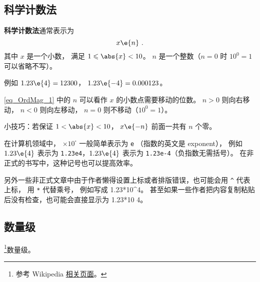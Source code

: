
\begin{issues}
\issueDraft
\end{issues}

\subsection{科学计数法}
\textbf{科学计数法}通常表示为
\begin{equation}\label{eq_OrdMag_1}
x \e{n}~.
\end{equation}
其中 $x$ 是一个小数， 满足 $1 \leqslant \abs{x} < 10$。 $n$ 是一个整数（$n=0$ 时 $10^{0} = 1$ 可以省略不写）。

例如 $1.23\e{4} = 12300$， $1.23\e{-4} = 0.000123$。

\autoref{eq_OrdMag_1} 中的 $n$ 可以看作 $x$ 的小数点需要移动的位数。 $n > 0$ 则向右移动， $n < 0$ 则向左移动， $n=0$ 则不移动（$10^{0} = 1$）。

小技巧：若保证 $1 < \abs{x} < 10$， $x\e{-n}$ 前面一共有 $n$ 个零。

在计算机领域中， $\times 10^\square$ 一般简单表示为 \verb`e` （指数的英文是 exponent）， 例如 $1.23\e{4}$ 表示为 \verb`1.23e4`，$1.23\e{4}$ 表示为 \verb`1.23e-4`（负指数无需括号）。 在非正式的书写中，这种记号也可以提高效率。

另外一些非正式文章中由于作者懒得设置上标或者排版错误，也可能会用 \verb`^` 代表上标， 用 \verb`*` 代替乘号， 例如写成 1.23*10^4。 甚至如果一些作者把内容复制粘贴后没有检查，也可能会直接显示为 1.23*10 4。

\subsection{数量级}
\footnote{参考 Wikipedia \href{https://en.wikipedia.org/wiki/Order_of_magnitude}{相关页面}。}数量级。

